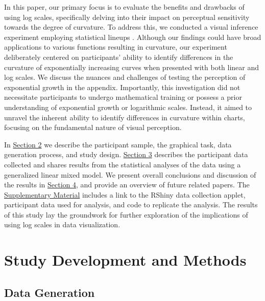 \documentclass[12pt]{article}
\begin{document}
In this paper, our primary focus is to evaluate the benefits and
drawbacks of using log scales, specifically delving into their impact on
perceptual sensitivity towards the degree of curvature. To address this,
we conducted a visual inference experiment employing statistical lineups
\citep{buja_statistical_2009}. Although our findings could have broad
applications to various functions resulting in curvature, our experiment
deliberately centered on participants' ability to identify differences
in the curvature of exponentially increasing curves when presented with
both linear and log scales. We discuss the nuances and challenges of
testing the perception of exponential growth in the appendix.
Importantly, this investigation did not necessitate participants to
undergo mathematical training or possess a prior understanding of
exponential growth or logarithmic scales. Instead, it aimed to unravel
the inherent ability to identify differences in curvature within charts,
focusing on the fundamental nature of visual perception.

In \protect\hyperlink{methods}{Section 2} we describe the participant
sample, the graphical task, data generation process, and study design.
\protect\hyperlink{results}{Section 3} describes the participant data
collected and shares results from the statistical analyses of the data
using a generalized linear mixed model. We present overall conclusions
and discussion of the results in
\protect\hyperlink{conclusion-discussion}{Section 4}, and provide an
overview of future related papers. The
\protect\hyperlink{supplementary-material}{Supplementary Material}
includes a link to the RShiny data collection applet, participant data
used for analysis, and code to replicate the analysis. The results of
this study lay the groundwork for further exploration of the
implications of using log scales in data visualization.

\hypertarget{methods}{%
\section{Study Development and Methods}\label{methods}}

\hypertarget{data-generation}{%
\subsection{Data Generation}\label{data-generation}}
\end{document}
